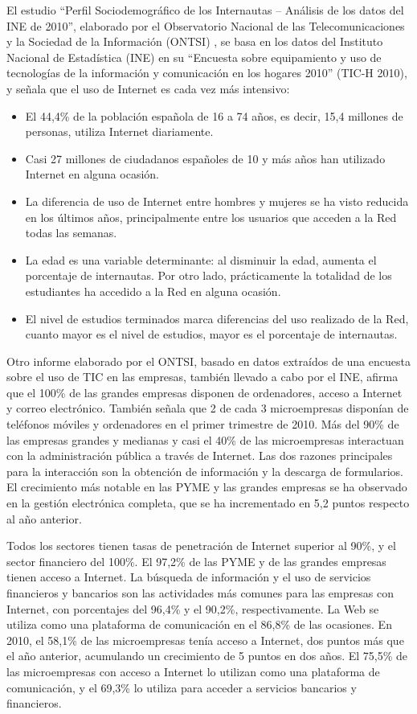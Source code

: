 \begin{multicols}{2}
El estudio “Perfil Sociodemográfico de los Internautas -- Análisis de los datos del INE de 2010”, elaborado por el Observatorio Nacional de las Telecomunicaciones y la Sociedad de la Información (ONTSI) \cite{ontsi}, se basa en los datos del Instituto Nacional de Estadística (INE) en su “Encuesta sobre equipamiento y uso de tecnologías de la información y comunicación en los hogares 2010” (TIC-H 2010), y señala que el uso de Internet es cada vez más intensivo:

\begin{itemize}
  \item	El 44,4\% de la población española de 16 a 74 años, es decir, 15,4 millones de personas, utiliza Internet diariamente.
  \item	Casi 27 millones de ciudadanos españoles de 10 y más años han utilizado Internet en alguna ocasión.
  \item	La diferencia de uso de Internet entre hombres y mujeres se ha visto reducida en los últimos años, principalmente entre los usuarios que acceden a la Red todas las semanas.
  \item	La edad es una variable determinante: al disminuir la edad, aumenta el porcentaje de internautas. Por otro lado, prácticamente la totalidad de los estudiantes ha accedido a la Red en alguna ocasión.
  \item	El nivel de estudios terminados marca diferencias del uso realizado de la Red, cuanto mayor es el nivel de estudios, mayor es el porcentaje de internautas.
\end{itemize}

Otro informe elaborado por el ONTSI, basado en datos extraídos de una encuesta sobre el uso de TIC en las empresas, también llevado a cabo por el INE, afirma que el 100\% de las grandes empresas disponen de ordenadores, acceso a Internet y correo electrónico. También señala que 2 de cada 3 microempresas disponían de teléfonos móviles y ordenadores en el primer trimestre de 2010. Más del 90\% de las empresas grandes y medianas y casi el 40\% de las microempresas interactuan con la administración pública a través de Internet. Las dos razones principales para la interacción son la obtención de información y la descarga de formularios. El crecimiento más notable en las PYME y las grandes empresas se ha observado en la gestión electrónica completa, que se ha incrementado en 5,2 puntos respecto al año anterior.

Todos los sectores tienen tasas de penetración de Internet superior al 90\%, y el sector financiero del 100\%. El 97,2\% de las PYME y de las grandes empresas tienen acceso a Internet. La búsqueda de información y el uso de servicios financieros y bancarios son las actividades más comunes para las empresas con Internet, con porcentajes del 96,4\% y el 90,2\%, respectivamente. La Web se utiliza como una plataforma de comunicación en el 86,8\% de las ocasiones. En 2010, el 58,1\% de las microempresas tenía acceso a Internet, dos puntos más que el año anterior, acumulando un crecimiento de 5 puntos en dos años. El 75,5\% de las microempresas con acceso a Internet lo utilizan como una plataforma de comunicación, y el 69,3\% lo utiliza para acceder a servicios bancarios y financieros. 


\end{multicols}
